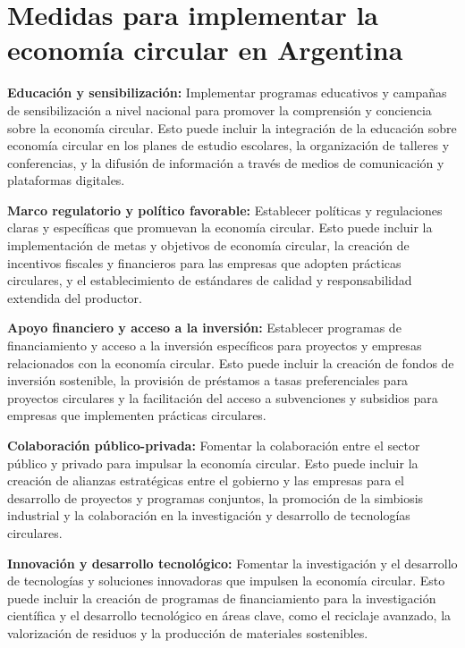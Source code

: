 \documentclass[runningheads]{llncs}
\begin{document}
\section{Medidas para implementar la economía circular en Argentina}

\hspace{0.5cm} \textbf{Educación y sensibilización:} Implementar programas educativos y campañas de sensibilización a nivel nacional para promover la comprensión y conciencia sobre la economía circular. Esto puede incluir la integración de la educación sobre economía circular en los planes de estudio escolares, la organización de talleres y conferencias, y la difusión de información a través de medios de comunicación y plataformas digitales.

\textbf{Marco regulatorio y político favorable:} Establecer políticas y regulaciones claras y específicas que promuevan la economía circular. Esto puede incluir la implementación de metas y objetivos de economía circular, la creación de incentivos fiscales y financieros para las empresas que adopten prácticas circulares, y el establecimiento de estándares de calidad y responsabilidad extendida del productor. 

\textbf{Apoyo financiero y acceso a la inversión:} Establecer programas de financiamiento y acceso a la inversión específicos para proyectos y empresas relacionados con la economía circular. Esto puede incluir la creación de fondos de inversión sostenible, la provisión de préstamos a tasas preferenciales para proyectos circulares y la facilitación del acceso a subvenciones y subsidios para empresas que implementen prácticas circulares.

\textbf{Colaboración público-privada:} Fomentar la colaboración entre el sector público y privado para impulsar la economía circular. Esto puede incluir la creación de alianzas estratégicas entre el gobierno y las empresas para el desarrollo de proyectos y programas conjuntos, la promoción de la simbiosis industrial y la colaboración en la investigación y desarrollo de tecnologías circulares.

\textbf{Innovación y desarrollo tecnológico:} Fomentar la investigación y el desarrollo de tecnologías y soluciones innovadoras que impulsen la economía circular. Esto puede incluir la creación de programas de financiamiento para la investigación científica y el desarrollo tecnológico en áreas clave, como el reciclaje avanzado, la valorización de residuos y la producción de materiales sostenibles.
\end{document}
